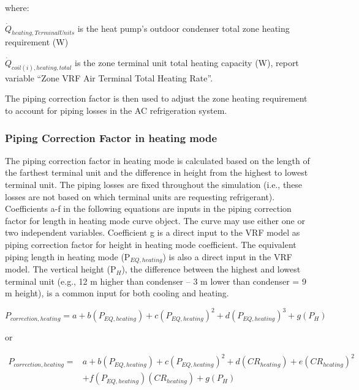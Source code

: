 where:

\(\dot{Q}_{heating,TerminalUnits}\) is the heat pump's outdoor condenser total zone heating requirement (W)

\(\dot{Q}_{coil(i),heating,total}\) is the zone terminal unit total heating capacity (W), report variable ``Zone VRF Air Terminal Total Heating Rate''.

The piping correction factor is then used to adjust the zone heating requirement to account for piping losses in the AC refrigeration system.

\subsubsection{Piping Correction Factor in heating mode}\label{piping-correction-factor-in-heating-mode}

The piping correction factor in heating mode is calculated based on the length of the farthest terminal unit and the difference in height from the highest to lowest terminal unit. The piping losses are fixed throughout the simulation (i.e., these losses are not based on which terminal units are requesting refrigerant). Coefficients a-f in the following equations are inputs in the piping correction factor for length in heating mode curve object. The curve may use either one or two independent variables. Coefficient g is a direct input to the VRF model as piping correction factor for height in heating mode coefficient. The equivalent piping length in heating mode (P\(_{EQ,heating}\)) is also a direct input in the VRF model. The vertical height (P\(_H\)), the difference between the highest and lowest terminal unit (e.g., 12 m higher than condenser – 3 m lower than condenser = 9 m height), is a common input for both cooling and heating.

\begin{equation}
  P_{correction,heating} = a + b \left( P_{EQ,heating} \right) + c \left( P_{EQ,heating} \right)^2 + d \left( P_{EQ,heating} \right)^3 + g \left( P_H \right)
\end{equation}

or

\begin{equation}
\begin{array}{rl}
{P_{correction,heating}} =& a + b \left( P_{EQ,heating} \right) + c \left( P_{EQ,heating} \right)^2 + d \left( CR_{heating} \right) + e \left( CR_{heating} \right)^2 \\
 & + f \left( P_{EQ,heating} \right) \left( CR_{heating} \right) + g \left( P_H \right)
\end{array}
\end{equation}

